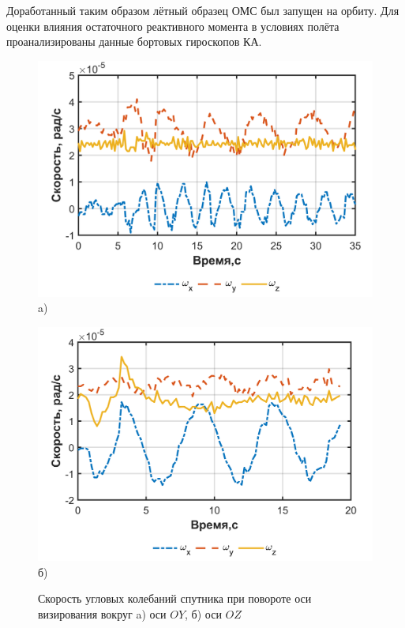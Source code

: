 Доработанный таким образом лётный образец ОМС был запущен на орбиту. Для оценки влияния остаточного реактивного момента в условиях полёта
проанализированы данные бортовых гироскопов КА.

 \begin{figure}[h!]
	\begin{minipage}[b][][b]{0.49\linewidth}\centering
		\includegraphics[width=1\linewidth]{matlab/img/sat_gyro_dataY.png} \\ a)
	\end{minipage}
	\hfill
	\begin{minipage}[b][][b]{0.49\linewidth}\centering
		\includegraphics[width=1\linewidth]{matlab/img/sat_gyro_dataZ.png} \\ б)
	\end{minipage}
	\caption{Скорость угловых колебаний спутника при повороте оси визирования вокруг a) оси $OY$, б) оси $OZ$ }
	\label{fig:rotationYZ}
\end{figure}

